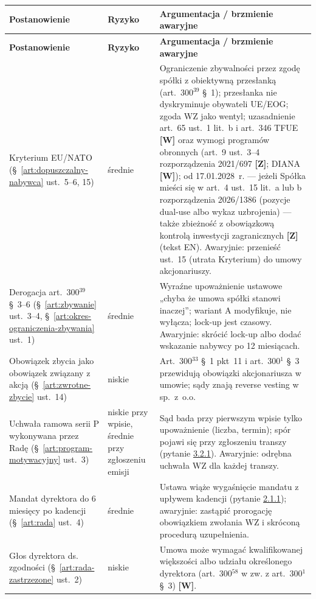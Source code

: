 \documentclass[12pt,a4paper]{report}
\newcommand{\Wiar}[1]{\textbf{[#1]}}
\begin{document}
\begin{longtable}{@{}p{4.0cm} p{1.9cm} p{8.3cm}@{}}
\toprule
\textbf{Postanowienie} & \textbf{Ryzyko} & \textbf{Argumentacja / brzmienie awaryjne} \\
\midrule
\endfirsthead
\toprule
\textbf{Postanowienie} & \textbf{Ryzyko} & \textbf{Argumentacja / brzmienie awaryjne} \\
\midrule
\endhead
Kryterium EU/NATO (§~\ref{art:dopuszczalny-nabywca} ust.~5--6, 15) & średnie & Ograniczenie zbywalności przez zgodę spółki z obiektywną przesłanką (art.~300$^{39}$ §~1); przesłanka nie dyskryminuje obywateli UE/EOG; zgoda WZ jako wentyl; uzasadnienie art.~65 ust.~1 lit.~b i art.~346 TFUE \Wiar{W} oraz wymogi programów obronnych (art.~9 ust.~3--4 rozporządzenia 2021/697 \Wiar{Z}; DIANA \Wiar{W}); od 17.01.2028~r. --- jeżeli Spółka mieści się w art.~4 ust.~15 lit.~a lub b rozporządzenia 2026/1386 (pozycje dual-use albo wykaz uzbrojenia) --- także zbieżność z obowiązkową kontrolą inwestycji zagranicznych \Wiar{Z} (tekst EN). Awaryjnie: przenieść ust.~15 (utrata Kryterium) do umowy akcjonariuszy. \\
Derogacja art.~300$^{39}$ §~3--6 (§~\ref{art:zbywanie} ust.~3--4, §~\ref{art:okres-ograniczenia-zbywania} ust.~1) & średnie & Wyraźne upoważnienie ustawowe „chyba że umowa spółki stanowi inaczej”; wariant A modyfikuje, nie wyłącza; lock-up jest czasowy. Awaryjnie: skrócić lock-up albo dodać wskazanie nabywcy po 12 miesiącach. \\
Obowiązek zbycia jako obowiązek związany z akcją (§~\ref{art:zwrotne-zbycie} ust.~14) & niskie & Art.~300$^{33}$ §~1 pkt~11 i art.~300$^{1}$ §~3 przewidują obowiązki akcjonariusza w umowie; sądy znają reverse vesting w sp.~z~o.o. \\
Uchwała ramowa serii P wykonywana przez Radę (§~\ref{art:program-motywacyjny} ust.~3) & niskie przy wpisie, średnie przy zgłoszeniu emisji & Sąd bada przy pierwszym wpisie tylko upoważnienie (liczba, termin); spór pojawi się przy zgłoszeniu transzy (pytanie \hyperref[memo:3.2.1]{3.2.1}). Awaryjnie: odrębna uchwała WZ dla każdej transzy. \\
Mandat dyrektora do 6 miesięcy po kadencji (§~\ref{art:rada} ust.~4) & średnie & Ustawa wiąże wygaśnięcie mandatu z upływem kadencji (pytanie \hyperref[memo:2.1.1]{2.1.1}); awaryjnie: zastąpić prorogację obowiązkiem zwołania WZ i skróconą procedurą uzupełnienia. \\
Głos dyrektora ds. zgodności (§~\ref{art:rada-zastrzezone} ust.~2) & niskie & Umowa może wymagać kwalifikowanej większości albo udziału określonego dyrektora (art.~300$^{58}$ w zw. z art.~300$^{1}$ §~3) \Wiar{W}. \\

\end{longtable}
\end{document}
